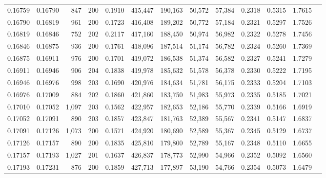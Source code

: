 \begin{tabular}{rrrrrrrrrrrrr}
0.16759 & 0.16790 &   847 & 200 &                                     0.1910 & 415,447 & 190,163 &  50,572 &  57,384 & 0.2318 & 0.5315 & 1.7615 \\
0.16790 & 0.16819 &   961 & 200 &                                     0.1723 & 416,408 & 189,202 &  50,772 &  57,184 & 0.2321 & 0.5297 & 1.7526 \\
0.16819 & 0.16846 &   752 & 202 &                                     0.2117 & 417,160 & 188,450 &  50,974 &  56,982 & 0.2322 & 0.5278 & 1.7456 \\
0.16846 & 0.16875 &   936 & 200 &                                     0.1761 & 418,096 & 187,514 &  51,174 &  56,782 & 0.2324 & 0.5260 & 1.7369 \\
0.16875 & 0.16911 &   976 & 200 &                                     0.1701 & 419,072 & 186,538 &  51,374 &  56,582 & 0.2327 & 0.5241 & 1.7279 \\
0.16911 & 0.16946 &   906 & 204 &                                     0.1838 & 419,978 & 185,632 &  51,578 &  56,378 & 0.2330 & 0.5222 & 1.7195 \\
0.16946 & 0.16976 &   998 & 203 &                                     0.1690 & 420,976 & 184,634 &  51,781 &  56,175 & 0.2333 & 0.5204 & 1.7103 \\
0.16976 & 0.17009 &   884 & 202 &                                     0.1860 & 421,860 & 183,750 &  51,983 &  55,973 & 0.2335 & 0.5185 & 1.7021 \\
0.17010 & 0.17052 & 1,097 & 203 &                                     0.1562 & 422,957 & 182,653 &  52,186 &  55,770 & 0.2339 & 0.5166 & 1.6919 \\
0.17052 & 0.17091 &   890 & 203 &                                     0.1857 & 423,847 & 181,763 &  52,389 &  55,567 & 0.2341 & 0.5147 & 1.6837 \\
0.17091 & 0.17126 & 1,073 & 200 &                                     0.1571 & 424,920 & 180,690 &  52,589 &  55,367 & 0.2345 & 0.5129 & 1.6737 \\
0.17126 & 0.17157 &   890 & 200 &                                     0.1835 & 425,810 & 179,800 &  52,789 &  55,167 & 0.2348 & 0.5110 & 1.6655 \\
0.17157 & 0.17193 & 1,027 & 201 &                                     0.1637 & 426,837 & 178,773 &  52,990 &  54,966 & 0.2352 & 0.5092 & 1.6560 \\
0.17193 & 0.17231 &   876 & 200 &                                     0.1859 & 427,713 & 177,897 &  53,190 &  54,766 & 0.2354 & 0.5073 & 1.6479 \\

\end{tabular}
